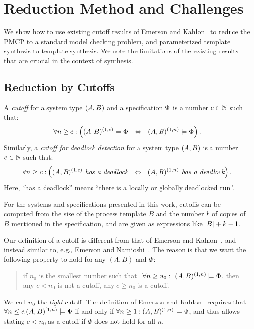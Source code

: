 \section{Reduction Method and Challenges} \label{gua:sec:paramsynt}
 
We show how to use existing cutoff results of Emerson and Kahlon~\cite{Emerson00} to reduce the PMCP to a standard model checking problem,
and parameterized template synthesis to template synthesis.
We note the limitations of the existing results that are crucial in the context of synthesis.

\subsection*{Reduction by Cutoffs} \label{page:gua:def:cutoff}

A \emph{cutoff} for a system type $(A,B)$ and a specification $\Phi$ is a number $c \in \mathbb{N}$ such that:
\[ 
\forall n \ge c: \left( (A,B)^{(1,c)} \models \Phi ~~\Leftrightarrow~~ (A,B)^{(1,n)} \models \Phi \right).
\]
Similarly,
a \emph{cutoff for deadlock detection} for a system type $(A,B)$ is a number $c \in \mathbb{N}$ such that:
\[ 
\forall n \ge c: \left( (A,B)^{(1,c)} \textit{ has a deadlock} ~~\Leftrightarrow~~ (A,B)^{(1,n)} \textit{ has a deadlock}\right).
\]
Here, ``has a deadlock'' means ``there is a locally or globally deadlocked run''.

For the systems and specifications presented in this work, cutoffs can be computed from 
the size of the process template $B$ and the number $k$ of copies of $B$ 
mentioned in the specification, and are given as expressions like 
$\left| {B} \right|+k+1$.

\begin{remark}\label{re:EK_cutoffs}
Our definition of a cutoff is different from that of Emerson and Kahlon~\cite{Emerson00}, and instead similar to, e.g., Emerson and Namjoshi~\cite{Emerso03}. The reason is that we want the following property to hold for any $(A,B)$ and $\Phi$: 
\begin{quote}
if $n_0$ is the smallest number such that ~$\forall n \geq n_0:\ (A,B)^{(1,n)} \models \Phi$,
then any $c<n_0$ is not a cutoff, any $c\geq n_0$ is a cutoff.
\end{quote}
We call $n_0$ the \emph{tight} cutoff.
The definition of Emerson and Kahlon~\cite[page 2]{Emerson00} requires that
$\forall{n\leq c}. (A,B)^{(1,n)} \models \Phi$
if and only if
$\forall{n \geq 1}: (A,B)^{(1,n)} \models \Phi$, and thus allows stating $c<n_0$ as a cutoff if $\Phi$ does not hold for all $n$.
\end{remark}

